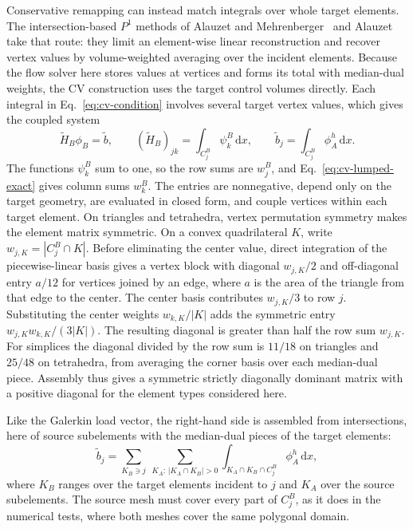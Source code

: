 \documentclass[a4paper,fleqn]{cas-sc}
\newcommand{\dd}{\,\mathrm{d}}
\begin{document}
Conservative remapping can instead match integrals over whole target elements. The intersection-based $P^1$ methods of Alauzet and Mehrenberger~\cite{AlauzetMehrenberger2010} and Alauzet~\cite{Alauzet2016} take that route: they limit an element-wise linear reconstruction and recover vertex values by volume-weighted averaging over the incident elements. Because the flow solver here stores values at vertices and forms its total with median-dual weights, the CV construction uses the target control volumes directly. Each integral in Eq.~\eqref{eq:cv-condition} involves several target vertex values, which gives the coupled system
\begin{equation}
 \widetilde H_B\phi_B=\tilde b,\qquad
 (\widetilde H_B)_{jk}=\int_{C_j^B}\psi_k^B\dd x,
 \qquad \tilde b_j=\int_{C_j^B}\phi_A^h\dd x.
 \label{eq:cv-system}
\end{equation}
The functions $\psi_k^B$ sum to one, so the row sums are $w_j^B$, and Eq.~\eqref{eq:cv-lumped-exact} gives column sums $w_k^B$. The entries are nonnegative, depend only on the target geometry, are evaluated in closed form, and couple vertices within each target element. On triangles and tetrahedra, vertex permutation symmetry makes the element matrix symmetric. On a convex quadrilateral $K$, write $w_{j,K}=|C_j^B\cap K|$. Before eliminating the center value, direct integration of the piecewise-linear basis gives a vertex block with diagonal $w_{j,K}/2$ and off-diagonal entry $a/12$ for vertices joined by an edge, where $a$ is the area of the triangle from that edge to the center. The center basis contributes $w_{j,K}/3$ to row $j$. Substituting the center weights $w_{k,K}/|K|$ adds the symmetric entry $w_{j,K}w_{k,K}/(3|K|)$. The resulting diagonal is greater than half the row sum $w_{j,K}$. For simplices the diagonal divided by the row sum is $11/18$ on triangles and $25/48$ on tetrahedra, from averaging the corner basis over each median-dual piece. Assembly thus gives a symmetric strictly diagonally dominant matrix with a positive diagonal for the element types considered here.

Like the Galerkin load vector, the right-hand side is assembled from intersections, here of source subelements with the median-dual pieces of the target elements:
\begin{equation}
 \tilde b_j=\sum_{K_B\ni j}\ \sum_{K_A:\,|K_A\cap K_B|>0}
      \int_{K_A\cap K_B\cap C_j^B}\phi_A^h\dd x,
 \label{eq:cv-load-intersections}
\end{equation}
where $K_B$ ranges over the target elements incident to $j$ and $K_A$ over the source subelements. The source mesh must cover every part of $C_j^B$, as it does in the numerical tests, where both meshes cover the same polygonal domain.
\end{document}
